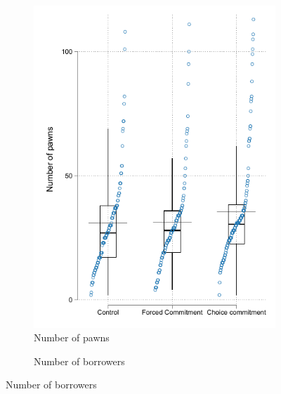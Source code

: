 \begin{figure}[H]
     \caption{Box-plot across arms}
    \label{boxplot_attrition}
    \begin{center}
    \begin{subfigure}{0.35\textwidth}
    \caption{Number of pawns}
        \centering
        \includegraphics[width=\textwidth]{Figuras/box_plot_num_pawns.pdf}
    \end{subfigure}
        \begin{subfigure}{0.35\textwidth}
    \caption{Number of borrowers}
        \centering

\end{subfigure}
\end{center}
\end{figure}
